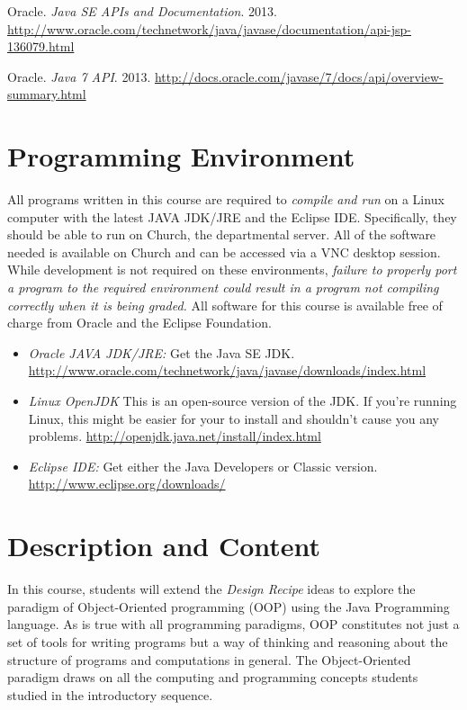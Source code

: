 \documentclass[10pt]{article}
\begin{document}
Oracle. \textit{Java SE APIs and Documentation}. 2013. 
\newline
\url{http://www.oracle.com/technetwork/java/javase/documentation/api-jsp-136079.html}
\vspace{.25in}

Oracle. \textit{Java 7 API}. 2013.
\newline
\url{http://docs.oracle.com/javase/7/docs/api/overview-summary.html}


\section{Programming Environment}

All programs written in this course are required to \emph{compile and run} on a Linux computer with the latest JAVA JDK/JRE and the Eclipse IDE.  Specifically, they should be able to run on Church, the departmental server.  All of the software needed is available on Church and can be accessed via a VNC desktop session. While development is not required on these environments, \emph{failure to properly port a program to the required environment could result in a program not compiling correctly when it is being graded.}  All software for this course is available free of charge from Oracle and the Eclipse Foundation.
\begin{itemize}
\item \emph{Oracle JAVA JDK/JRE:}  Get the Java SE JDK. 
\newline \url{http://www.oracle.com/technetwork/java/javase/downloads/index.html}
\item \textit{Linux OpenJDK} This is an open-source version of the JDK.  If you're running Linux, this might be easier for your to install and shouldn't cause you any problems.\newline
\url{http://openjdk.java.net/install/index.html} 
\item \emph{Eclipse IDE:} Get either the Java Developers or Classic version. \newline
\url{http://www.eclipse.org/downloads/} 
\end{itemize} 


\section{Description and Content}

In this course, students will extend the \textit{Design Recipe} ideas to explore the paradigm of Object-Oriented programming (OOP) using the Java Programming language.  As is true with all programming paradigms, OOP constitutes not just a set of tools for writing programs but a way of thinking and reasoning about the structure of programs and computations in general.   The Object-Oriented paradigm draws on all the computing and programming concepts students studied in the introductory sequence.
\end{document}
